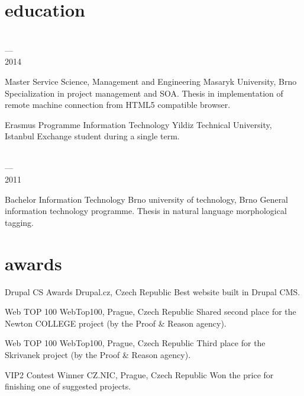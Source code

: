 \documentclass[]{friggeri-cv} %
\begin{document}
\pagebreak

\section{education}

\begin{entrylist}
  \entry
  {\parbox[t]{2cm}{ \\ --- \\ 2014}}
  {Master {\normalfont Service Science, Management and Engineering}}
  {Masaryk University, Brno}
  {
    \thesis
    {Specialization in project management and SOA.}
    {Thesis in implementation of remote machine connection from HTML5 compatible browser.}
  }
  \entry
  {\parbox[t]{2cm}{}}
  {Erasmus Programme {\normalfont Information Technology}}
  {Yildiz Technical University, Istanbul}
  {Exchange student during a single term.\medskip}
  \entry
  {\parbox[t]{2cm}{ \\ --- \\ 2011}}
  {Bachelor {\normalfont Information Technology}}
  {Brno university of technology, Brno}
  {
    \thesis
    {General information technology programme.}
    {Thesis in natural language morphological tagging.}
  }
\end{entrylist}


\section{awards}

\begin{entrylist}
\entry
{\parbox[t]{2cm}{}}
{Drupal CS Awards}
{Drupal.cz, Czech Republic}
{Best website built in Drupal CMS.}
\entry
{\parbox[t]{2cm}{}}
{Web TOP 100}
{WebTop100, Prague, Czech Republic}
{Shared second place for the Newton COLLEGE project (by the Proof \& Reason agency).}
\entry
{\parbox[t]{2cm}{}}
{Web TOP 100}
{WebTop100, Prague, Czech Republic}
{Third place for the Skrivanek project (by the Proof \& Reason agency).}
\entry
{\parbox[t]{2cm}{}}
{VIP2 Contest Winner}
{CZ.NIC, Prague, Czech Republic}
{Won the price for finishing one of suggested projects.}
\end{entrylist}
\end{document}
